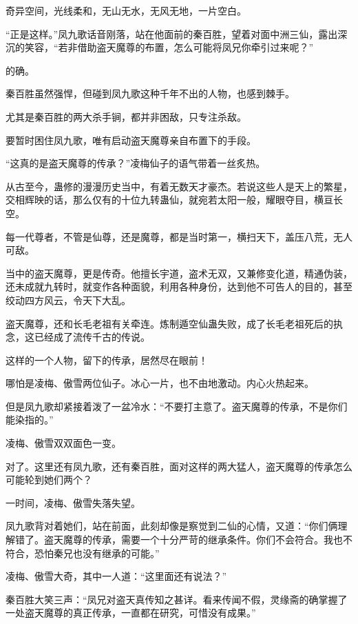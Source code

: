 
\begin{this_body}



奇异空间，光线柔和，无山无水，无风无地，一片空白。

“正是这样。”凤九歌话音刚落，站在他面前的秦百胜，望着对面中洲三仙，露出深沉的笑容，“若非借助盗天魔尊的布置，怎么可能将凤兄你牵引过来呢？”

的确。

秦百胜虽然强悍，但碰到凤九歌这种千年不出的人物，也感到棘手。

尤其是秦百胜的两大杀手锏，都并非困敌，只专注杀敌。

要暂时困住凤九歌，唯有启动盗天魔尊亲自布置下的手段。

“这真的是盗天魔尊的传承？”凌梅仙子的语气带着一丝炙热。

从古至今，蛊修的漫漫历史当中，有着无数天才豪杰。若说这些人是天上的繁星，交相辉映的话，那么仅有的十位九转蛊仙，就宛若太阳一般，耀眼夺目，横亘长空。

每一代尊者，不管是仙尊，还是魔尊，都是当时第一，横扫天下，盖压八荒，无人可敌。

当中的盗天魔尊，更是传奇。他擅长宇道，盗术无双，又兼修变化道，精通伪装，还未成就九转时，就变作各种面貌，利用各种身份，达到他不可告人的目的，甚至绞动四方风云，令天下大乱。

盗天魔尊，还和长毛老祖有关牵连。炼制遁空仙蛊失败，成了长毛老祖死后的执念，这已经成了流传千古的传说。

这样的一个人物，留下的传承，居然尽在眼前！

哪怕是凌梅、傲雪两位仙子。冰心一片，也不由地激动。内心火热起来。

但是凤九歌却紧接着泼了一盆冷水：“不要打主意了。盗天魔尊的传承，不是你们能染指的。”

凌梅、傲雪双双面色一变。

对了。这里还有凤九歌，还有秦百胜，面对这样的两大猛人，盗天魔尊的传承怎么可能轮到她们两个？

一时间，凌梅、傲雪失落失望。

凤九歌背对着她们，站在前面，此刻却像是察觉到二仙的心情，又道：“你们俩理解错了。盗天魔尊的传承，需要一个十分严苛的继承条件。你们不会符合。我也不符合，恐怕秦兄也没有继承的可能。”

凌梅、傲雪大奇，其中一人道：“这里面还有说法？”

秦百胜大笑三声：“凤兄对盗天真传知之甚详。看来传闻不假，灵缘斋的确掌握了一处盗天魔尊的真正传承，一直都在研究，可惜没有成果。”


\end{this_body}
